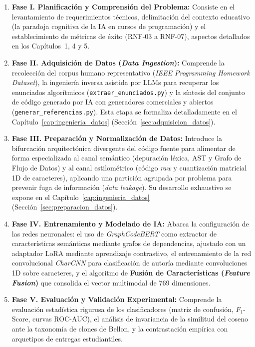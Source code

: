 \begin{enumerate}
    \item \textbf{Fase I. Planificación y Comprensión del Problema:} Consiste en el levantamiento de requerimientos técnicos, delimitación del contexto educativo (la paradoja cognitiva de la IA en cursos de programación) y el establecimiento de métricas de éxito (RNF-03 a RNF-07), aspectos detallados en los Capítulos~1, 4 y 5.
    
    \item \textbf{Fase II. Adquisición de Datos (\textit{Data Ingestion}):} Comprende la recolección del corpus humano representativo (\textit{IEEE Programming Homework Dataset}), la ingeniería inversa asistida por LLMs para recuperar los enunciados algorítmicos (\texttt{extraer\_enunciados.py}) y la síntesis del conjunto de código generado por IA con generadores comerciales y abiertos (\texttt{generar\_referencias.py}). Esta etapa se formaliza detalladamente en el Capítulo~\ref{cap:ingenieria_datos} (Sección~\ref{sec:adquisicion_datos}).
    
    \item \textbf{Fase III. Preparación y Normalización de Datos:} Introduce la bifurcación arquitectónica divergente del código fuente para alimentar de forma especializada al canal semántico (depuración léxica, AST y Grafo de Flujo de Datos) y al canal estilométrico (código \textit{raw} y cuantización matricial 1D de caracteres), aplicando una partición agrupada por problema para prevenir fuga de información (\textit{data leakage}). Su desarrollo exhaustivo se expone en el Capítulo~\ref{cap:ingenieria_datos} (Sección~\ref{sec:preparacion_datos}).
    
    \item \textbf{Fase IV. Entrenamiento y Modelado de IA:} Abarca la configuración de las redes neuronales: el uso de \textit{GraphCodeBERT} como extractor de características semánticas mediante grafos de dependencias, ajustado con un adaptador LoRA mediante aprendizaje contrastivo, el entrenamiento de la red convolucional \textit{CharCNN} para clasificación de autoría mediante convoluciones 1D sobre caracteres, y el algoritmo de \textbf{Fusión de Características (\textit{Feature Fusion})} que consolida el vector multimodal de 769 dimensiones.
    
    \item \textbf{Fase V. Evaluación y Validación Experimental:} Comprende la evaluación estadística rigurosa de los clasificadores (matriz de confusión, $F_1$-Score, curvas ROC-AUC), el análisis de invariancia de la similitud del coseno ante la taxonomía de clones de Bellon, y la contrastación empírica con arquetipos de entregas estudiantiles.
    

\end{enumerate}
